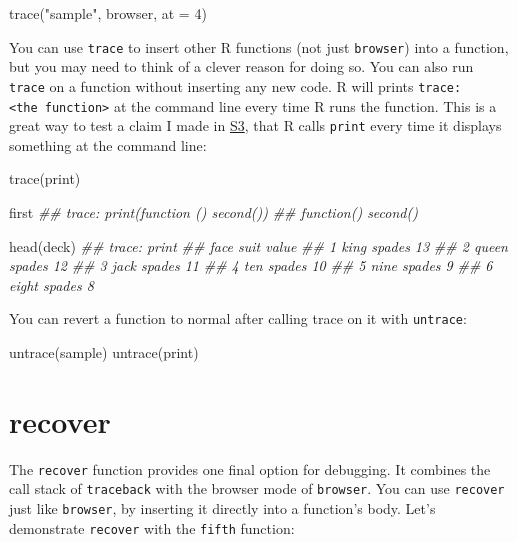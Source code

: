 \documentclass[
  letterpaper,
  DIV=11,
  numbers=noendperiod]{scrbook}
\newenvironment{Shaded}{\begin{snugshade}}{\end{snugshade}}
\newcommand{\AttributeTok}[1]{\textcolor[rgb]{0.40,0.45,0.13}{#1}}
\newcommand{\DecValTok}[1]{\textcolor[rgb]{0.68,0.00,0.00}{#1}}
\newcommand{\DocumentationTok}[1]{\textcolor[rgb]{0.37,0.37,0.37}{\textit{#1}}}
\newcommand{\FunctionTok}[1]{\textcolor[rgb]{0.28,0.35,0.67}{#1}}
\newcommand{\NormalTok}[1]{\textcolor[rgb]{0.00,0.23,0.31}{#1}}
\newcommand{\StringTok}[1]{\textcolor[rgb]{0.13,0.47,0.30}{#1}}
\begin{document}
\begin{Shaded}
\begin{Highlighting}[]
\FunctionTok{trace}\NormalTok{(}\StringTok{"sample"}\NormalTok{, browser, }\AttributeTok{at =} \DecValTok{4}\NormalTok{)}
\end{Highlighting}
\end{Shaded}

You can use \texttt{trace} to insert other R functions (not just
\texttt{browser}) into a function, but you may need to think of a clever
reason for doing so. You can also run \texttt{trace} on a function
without inserting any new code. R will prints
\texttt{trace:\textless{}the\ function\textgreater{}} at the command
line every time R runs the function. This is a great way to test a claim
I made in \hyperref[sec-s3]{S3}, that R calls \texttt{print} every time
it displays something at the command line:

\begin{Shaded}
\begin{Highlighting}[]
\FunctionTok{trace}\NormalTok{(print)}

\NormalTok{first}
\DocumentationTok{\#\# trace: print(function () second())}
\DocumentationTok{\#\# function() second()}

\FunctionTok{head}\NormalTok{(deck)}
\DocumentationTok{\#\# trace: print}
\DocumentationTok{\#\#    face   suit value}
\DocumentationTok{\#\# 1  king spades    13}
\DocumentationTok{\#\# 2 queen spades    12}
\DocumentationTok{\#\# 3  jack spades    11}
\DocumentationTok{\#\# 4   ten spades    10}
\DocumentationTok{\#\# 5  nine spades     9}
\DocumentationTok{\#\# 6 eight spades     8}
\end{Highlighting}
\end{Shaded}

You can revert a function to normal after calling trace on it with
\texttt{untrace}:

\begin{Shaded}
\begin{Highlighting}[]
\FunctionTok{untrace}\NormalTok{(sample)}
\FunctionTok{untrace}\NormalTok{(print)}
\end{Highlighting}
\end{Shaded}

\section{recover}\label{recover}

The \texttt{recover} function provides one final option for debugging.
It combines the call stack of \texttt{traceback} with the browser mode
of \texttt{browser}. You can use \texttt{recover} just like
\texttt{browser}, by inserting it directly into a function's body. Let's
demonstrate \texttt{recover} with the \texttt{fifth} function:
\end{document}
